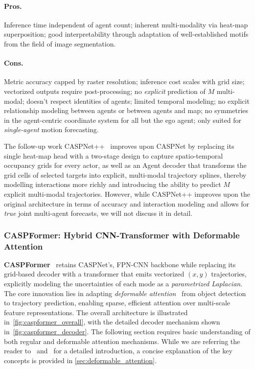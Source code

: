 \begin{description}[leftmargin=1em,itemsep=2pt]
\paragraph{Pros.} Inference time independent of agent count; inherent multi-modality via heat-map superposition; good interpretability through adaptation of well-established motifs from the field of image segmentation.
\paragraph{Cons.} Metric accuracy capped by raster resolution; inference cost scales with grid size; vectorized outputs require post-processing; no \emph{explicit} prediction of \( M \) multi-modal; doesn't respect identities of agents; limited temporal modeling; no explicit relationship modeling between agents or between agents and map; no symmetries in the agent-centric coordinate system for all but the ego agent; only suited for \emph{single-agent} motion forecasting.

The follow-up work CASPNet++~\cite{caspnetppSchäfer2023} improves upon CASPNet by replacing its single heat-map head with a two-stage design to capture spatio-temporal occupancy grids for every actor, as well as an Agent decoder that transforms the grid cells of selected targets into explicit, multi-modal trajectory splines, thereby modelling interactions more richly and introducing the ability to predict \( M \) explicit multi-modal trajectories. However, while CASPNet++ improves upon the original architecture in terms of accuracy and interaction modeling and allows for \emph{true} joint multi-agent forecasts, we will not discuss it in detail.

\subsubsection*{CASPFormer: Hybrid CNN-Transformer with Deformable Attention}
\label{ssec:caspformer}

\textbf{CASPFormer}~\cite{caspformerYadav2024} retains CASPNet's, FPN-CNN backbone while replacing its grid-based decoder with a transformer that emits vectorized \((x,y)\) trajectories, explicitly modeling the uncertainties of each mode as a \emph{parametrized Laplacian}. The core innovation lies in adapting \emph{deformable attention}~\cite{zhu2021deformabledetr} from object detection to trajectory prediction, enabling sparse, efficient attention over multi-scale feature representations. The overall architecture is illustrated in~\autoref{fig:caspformer_overall}, with the detailed decoder mechanism shown in~\autoref{fig:caspformer_decoder}. The following section requires basic understanding of both regular and deformable attention mechanisms. While we are referring the reader to~\cite{vaswani2023attention} and~\cite{zhu2021deformabledetr} for a detailed introduction, a concise explanation of the key concepts is provided in \autoref{sec:deformable_attention}.


\end{description}

